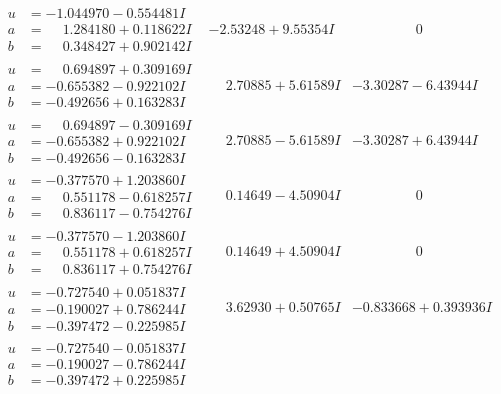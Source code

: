 \documentclass[1p]{elsarticle_modified}
\theoremstyle{definition}
\begin{document}
$$\begin{array}{c|c|c}
\begin{aligned}
u &= -1.044970 - 0.554481 I \\
a &= \phantom{-}1.284180 + 0.118622 I \\
b &= \phantom{-}0.348427 + 0.902142 I\end{aligned}
 & -2.53248 + 9.55354 I & \phantom{-0.000000 } 0 \\ \hline\begin{aligned}
u &= \phantom{-}0.694897 + 0.309169 I \\
a &= -0.655382 - 0.922102 I \\
b &= -0.492656 + 0.163283 I\end{aligned}
 & \phantom{-}2.70885 + 5.61589 I & -3.30287 - 6.43944 I \\ \hline\begin{aligned}
u &= \phantom{-}0.694897 - 0.309169 I \\
a &= -0.655382 + 0.922102 I \\
b &= -0.492656 - 0.163283 I\end{aligned}
 & \phantom{-}2.70885 - 5.61589 I & -3.30287 + 6.43944 I \\ \hline\begin{aligned}
u &= -0.377570 + 1.203860 I \\
a &= \phantom{-}0.551178 - 0.618257 I \\
b &= \phantom{-}0.836117 - 0.754276 I\end{aligned}
 & \phantom{-}0.14649 - 4.50904 I & \phantom{-0.000000 } 0 \\ \hline\begin{aligned}
u &= -0.377570 - 1.203860 I \\
a &= \phantom{-}0.551178 + 0.618257 I \\
b &= \phantom{-}0.836117 + 0.754276 I\end{aligned}
 & \phantom{-}0.14649 + 4.50904 I & \phantom{-0.000000 } 0 \\ \hline\begin{aligned}
u &= -0.727540 + 0.051837 I \\
a &= -0.190027 + 0.786244 I \\
b &= -0.397472 - 0.225985 I\end{aligned}
 & \phantom{-}3.62930 + 0.50765 I & -0.833668 + 0.393936 I \\ \hline\begin{aligned}
u &= -0.727540 - 0.051837 I \\
a &= -0.190027 - 0.786244 I \\
b &= -0.397472 + 0.225985 I\end{aligned}

\end{array}$$
\end{document}

